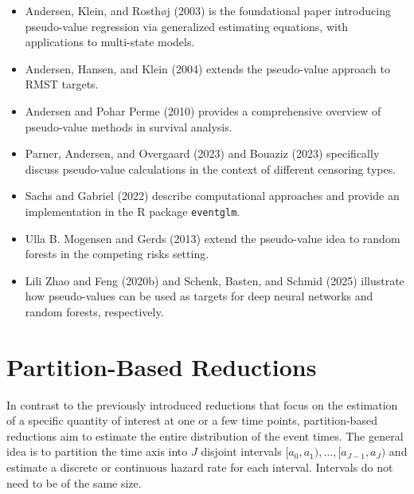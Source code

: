 \documentclass[
  letterpaper,
  krantz2]{style/krantz}
\providecommand{\tightlist}{%
  \setlength{\itemsep}{0pt}\setlength{\parskip}{0pt}}
\begin{document}
\begin{tcolorbox}[enhanced jigsaw, toprule=.15mm, bottomtitle=1mm, opacityback=0, breakable, leftrule=.75mm, title={Further reading}, toptitle=1mm, bottomrule=.15mm, colback=white, colframe=quarto-callout-tip-color-frame, titlerule=0mm, opacitybacktitle=0.6, coltitle=black, rightrule=.15mm, left=2mm, colbacktitle=quarto-callout-tip-color!10!white, arc=.35mm]

\begin{itemize}
\tightlist
\item
  Andersen, Klein, and Rosthøj (2003) is the foundational paper
  introducing pseudo-value regression via generalized estimating
  equations, with applications to multi-state models.
\item
  Andersen, Hansen, and Klein (2004) extends the pseudo-value approach
  to RMST targets.
\item
  Andersen and Pohar Perme (2010) provides a comprehensive overview of
  pseudo-value methods in survival analysis.
\item
  Parner, Andersen, and Overgaard (2023) and Bouaziz (2023) specifically
  discuss pseudo-value calculations in the context of different
  censoring types.
\item
  Sachs and Gabriel (2022) describe computational approaches and provide
  an implementation in the R package \texttt{eventglm}.
\item
  Ulla B. Mogensen and Gerds (2013) extend the pseudo-value idea to
  random forests in the competing risks setting.
\item
  Lili Zhao and Feng (2020b) and Schenk, Basten, and Schmid (2025)
  illustrate how pseudo-values can be used as targets for deep neural
  networks and random forests, respectively.
\end{itemize}

\end{tcolorbox}

\chapter{Partition-Based
Reductions}\label{sec-partition-based-reductions}

In contrast to the previously introduced reductions that focus on the
estimation of a specific quantity of interest at one or a few time
points, partition-based reductions aim to estimate the entire
distribution of the event times.
The general idea is to partition the time axis into \(J\) disjoint
intervals \([a_0,a_1),\ldots,[a_{J-1},a_J)\) and estimate a discrete or
continuous hazard rate for each interval. Intervals do not need to be of
the same size.
\end{document}
